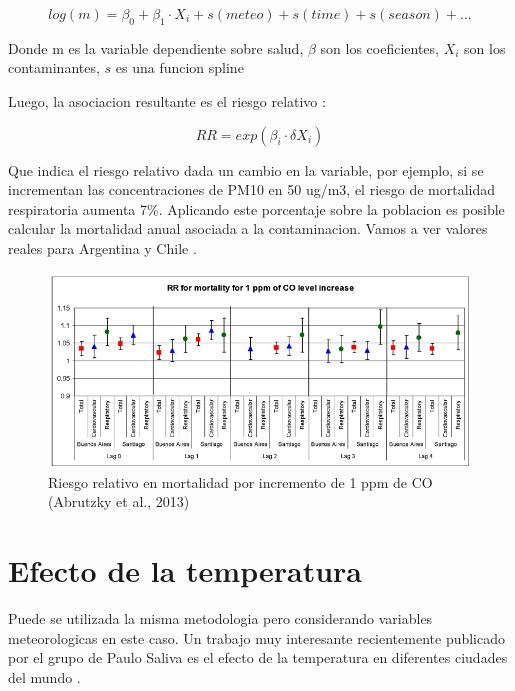 \documentclass[]{book}
\begin{document}
\begin{equation}
log(m) = \beta_0 + \beta_1 \cdot X_i + s(meteo) + s(time) + s(season) + ...
\label{eq:13}
\end{equation}

Donde m es la variable dependiente sobre salud, \(\beta\) son los coeficientes, \(X_i\) son los contaminantes, \(s\) es una funcion spline

Luego, la asociacion resultante es el riesgo relativo \citep{rosana}:

\begin{equation}
RR = exp(\beta_i \cdot \delta X_i)
\label{eq:13}
\end{equation}

Que indica el riesgo relativo dada un cambio en la variable, por ejemplo, si se incrementan las concentraciones de PM10 en 50 ug/m3, el riesgo de mortalidad respiratoria aumenta 7\%. Aplicando este porcentaje sobre la poblacion es posible calcular la mortalidad anual asociada a la contaminacion. Vamos a ver valores reales para Argentina y Chile \citep{rosana}.

\begin{figure}
\includegraphics[width=11.44in,height=1.8\textheight]{figs/rosana1} \caption{Riesgo relativo en mortalidad por incremento de 1 ppm de CO (Abrutzky et al., 2013)}\label{fig:unnamed-chunk-39}
\end{figure}

\hypertarget{efecto-de-la-temperatura}{%
\section{Efecto de la temperatura}\label{efecto-de-la-temperatura}}

Puede se utilizada la misma metodologia pero considerando variables meteorologicas en este caso. Un trabajo muy interesante recientemente publicado por el grupo de Paulo Saliva es el efecto de la temperatura en diferentes ciudades del mundo \citep{GASPARRINI2015369}.
\end{document}
